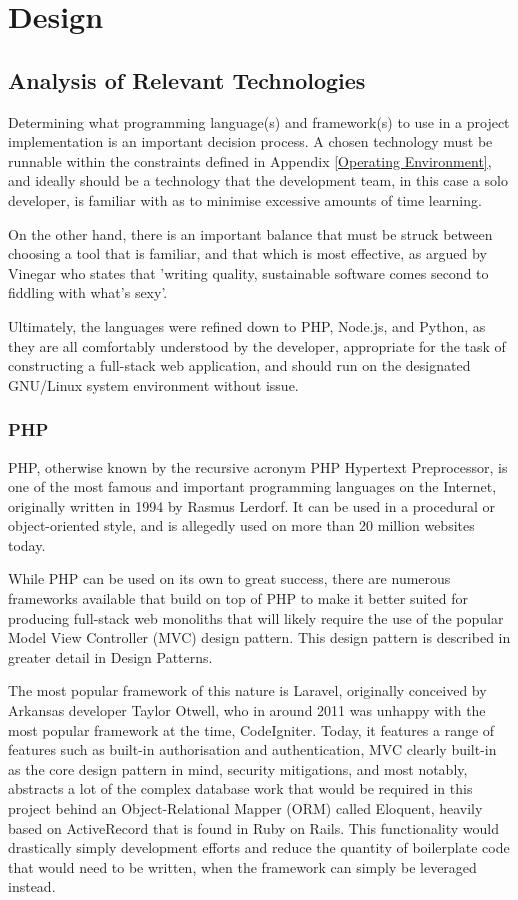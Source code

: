 \chapter{Design}

\section{Analysis of Relevant Technologies}
Determining what programming language(s) and framework(s) to use in a project implementation is an important decision process. A chosen technology must be runnable within the constraints defined in Appendix \ref{Operating Environment}, and ideally should be a technology that the development team, in this case a solo developer, is familiar with as to minimise excessive amounts of time learning.

On the other hand, there is an important balance that must be struck between choosing a tool that is familiar, and that which is most effective, as argued by Vinegar who states that 'writing quality, sustainable software comes second to fiddling with what's sexy'. \cite{Vinegar1}

Ultimately, the languages were refined down to PHP, Node.js, and Python, as they are all comfortably understood by the developer, appropriate for the task of constructing a full-stack web application, and should run on the designated GNU/Linux system environment without issue.

\subsection{PHP}
PHP, otherwise known by the recursive acronym PHP Hypertext Preprocessor, is one of the most famous and important programming languages on the Internet, originally written in 1994 by Rasmus Lerdorf. It can be used in a procedural or object-oriented style, and is allegedly used on more than 20 million websites today. \cite{Wolfe1}

While PHP can be used on its own to great success, there are numerous frameworks available that build on top of PHP to make it better suited for producing full-stack web monoliths that will likely require the use of the popular Model View Controller (MVC) design pattern. This design pattern is described in greater detail in Design Patterns.

The most popular framework of this nature is Laravel, originally conceived by Arkansas developer Taylor Otwell, who in around 2011 was unhappy with the most popular framework at the time, CodeIgniter. \cite{OBrien1} Today, it features a range of features such as built-in authorisation and authentication, MVC clearly built-in as the core design pattern in mind, security mitigations, and most notably, abstracts a lot of the complex database work that would be required in this project behind an Object-Relational Mapper (ORM) called Eloquent, heavily based on ActiveRecord that is found in Ruby on Rails. This functionality would drastically simply development efforts and reduce the quantity of boilerplate code that would need to be written, when the framework can simply be leveraged instead. \cite{Shah1} \cite{Laravel1}

